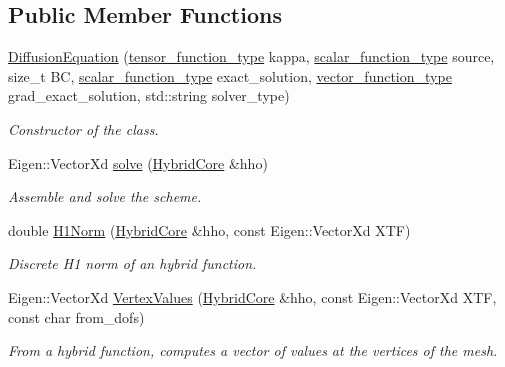 \subsection*{Public Member Functions}
\begin{DoxyCompactItemize}
\item 
\hyperlink{group__HHO__diffusion_ga9a10d995a8b537474dc0d9a2e0a9a04b}{Diffusion\+Equation} (\hyperlink{classHArDCore2D_1_1DiffusionEquation_acb28d76dbd9b3c07f20a996f74915b76}{tensor\+\_\+function\+\_\+type} kappa, \hyperlink{classHArDCore2D_1_1DiffusionEquation_ae1c7c45bf1c9402b11d431716f5e1936}{scalar\+\_\+function\+\_\+type} source, size\+\_\+t BC, \hyperlink{classHArDCore2D_1_1DiffusionEquation_ae1c7c45bf1c9402b11d431716f5e1936}{scalar\+\_\+function\+\_\+type} exact\+\_\+solution, \hyperlink{classHArDCore2D_1_1DiffusionEquation_a8fb1165da7a58b15bc4ed9a86829290a}{vector\+\_\+function\+\_\+type} grad\+\_\+exact\+\_\+solution, std\+::string solver\+\_\+type)
\begin{DoxyCompactList}\small\item\em Constructor of the class. \end{DoxyCompactList}\item 
Eigen\+::\+Vector\+Xd \hyperlink{group__HHO__diffusion_gaa5df2366a6063c0e11cd79f3f3ec3f5d}{solve} (\hyperlink{classHArDCore2D_1_1HybridCore}{Hybrid\+Core} \&hho)
\begin{DoxyCompactList}\small\item\em Assemble and solve the scheme. \end{DoxyCompactList}\item 
double \hyperlink{group__HHO__diffusion_ga6859be195fb96cc7cf80839cd714dde8}{H1\+Norm} (\hyperlink{classHArDCore2D_1_1HybridCore}{Hybrid\+Core} \&hho, const Eigen\+::\+Vector\+Xd X\+TF)
\begin{DoxyCompactList}\small\item\em Discrete H1 norm of an hybrid function. \end{DoxyCompactList}\item 
Eigen\+::\+Vector\+Xd \hyperlink{group__HHO__diffusion_ga76c336893c4f79547a6059a816aa3532}{Vertex\+Values} (\hyperlink{classHArDCore2D_1_1HybridCore}{Hybrid\+Core} \&hho, const Eigen\+::\+Vector\+Xd X\+TF, const char from\+\_\+dofs)
\begin{DoxyCompactList}\small\item\em From a hybrid function, computes a vector of values at the vertices of the mesh. \end{DoxyCompactList}\item 

\end{DoxyCompactItemize}

